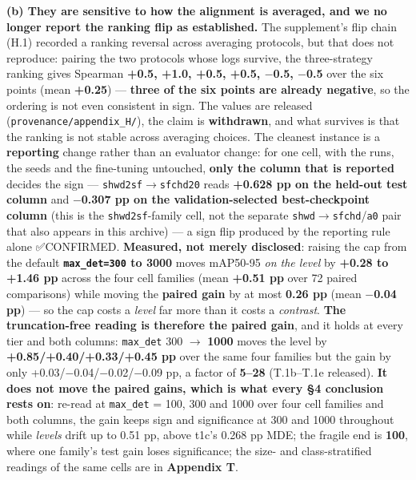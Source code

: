\documentclass[pdflatex,sn-mathphys-ay]{sn-jnl}
\begin{document}
\textbf{(b) They are sensitive to how the alignment is averaged, and we no longer report the ranking flip as established.} The supplement's flip chain (H.1) recorded a ranking reversal across averaging protocols, but that does not reproduce: pairing the two protocols whose logs survive, the three-strategy ranking gives Spearman \textbf{+0.5, +1.0, +0.5, +0.5, \ensuremath{-}0.5, \ensuremath{-}0.5} over the six points (mean \textbf{+0.25}) --- \textbf{three of the six points are already negative}, so the ordering is not even consistent in sign. The values are released (\texttt{provenance/appendix\_H/}), the claim is \textbf{withdrawn}, and what survives is that the ranking is not stable across averaging choices. The cleanest instance is a \textbf{reporting} change rather than an evaluator change: for one cell, with the runs, the seeds and the fine-tuning untouched, \textbf{only the column that is reported} decides the sign --- \texttt{shwd2sf\ensuremath{\rightarrow}sfchd20} reads \textbf{+0.628 pp on the held-out test column} and \textbf{\ensuremath{-}0.307 pp on the validation-selected best-checkpoint column} (this is the \texttt{shwd2sf}-family cell, not the separate \texttt{shwd\ensuremath{\rightarrow}sfchd}/\texttt{a0} pair that also appears in this archive) --- a sign flip produced by the reporting rule alone ✅CONFIRMED. \textbf{Measured, not merely disclosed}: raising the cap from the default \textbf{\texttt{max\_det=300} to 3000} moves mAP50-95 \emph{on the level} by \textbf{+0.28 to +1.46 pp} across the four cell families (mean \textbf{+0.51 pp} over 72 paired comparisons) while moving the \textbf{paired gain} by at most \textbf{0.26 pp} (mean \textbf{\ensuremath{-}0.04 pp}) --- so the cap costs a \emph{level} far more than it costs a \emph{contrast}. \textbf{The truncation-free reading is therefore the paired gain}, and it holds at every tier and both columns: \texttt{max\_det} 300 \ensuremath{\rightarrow} \textbf{1000} moves the level by \textbf{+0.85/+0.40/+0.33/+0.45 pp} over the same four families but the gain by only +0.03/\ensuremath{-}0.04/\ensuremath{-}0.02/\ensuremath{-}0.09 pp, a factor of \textbf{5--28} (T.1b--T.1e released). \textbf{It does not move the paired gains, which is what every \S{}4 conclusion rests on}: re-read at \texttt{max\_det} = 100, 300 and 1000 over four cell families and both columns, the gain keeps sign and significance at 300 and 1000 throughout while \emph{levels} drift up to 0.51 pp, above t1c's 0.268 pp MDE; the fragile end is \textbf{100}, where one family's test gain loses significance; the size- and class-stratified readings of the same cells are in \textbf{Appendix T}.
\end{document}
